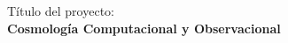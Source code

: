 \section*{}
\begin{center}
{\LARGE T\'itulo del proyecto: \\ {\bf Cosmolog\'ia Computacional y Observacional}}
\end{center}

